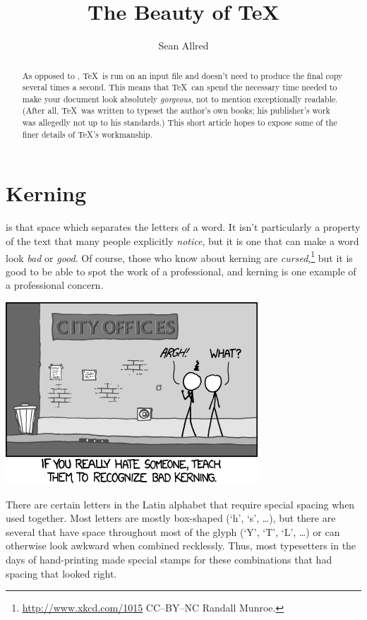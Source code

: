 \documentclass{article}
\title{The Beauty of \TeX}
\author{Sean Allred}
\begin{document}
\maketitle

\begin{abstract}
As opposed to \MicrosoftWord,
  \TeX\ is run on an input file and
  doesn't need to produce the final copy
  several times a second.
This means that \TeX\ can spend
  the necessary time needed
  to make your document
  look absolutely \emph{gorgeous},
  not to mention exceptionally readable.
(After all, \TeX\ was written to typeset the author's own books;
 his publisher's work was allegedly not up to his standards.)
This short article hopes
  to expose some of the finer details
  of \TeX's workmanship.
\end{abstract}
\vfil
\tableofcontents
\newpage

\section{Kerning}
\label{sec:kerning}

 is that space which separates the letters of a word.
It isn't particularly a property of the text that many people explicitly \emph{notice},
  but it is one that can make a word look \emph{bad} or \emph{good}.
Of course, those who know about kerning are \emph{cursed},\footnote{%
  \url{http://www.xkcd.com/1015} CC--BY--NC Randall Munroe.}
  but it is good to be able to spot the work of a professional,
  and kerning is one example of a professional concern.

\begin{center}
  \includegraphics[width=.5\linewidth]{xkcd-kerning}
\end{center}

\noindent
There are certain letters in the Latin alphabet that
  require special spacing when used together.
Most letters are mostly box-shaped (`h', `s', \dots),
  but there are several that have space
  throughout most of the glyph (`Y', `T', `L', \dots)
  or can otherwise look awkward when combined recklessly.
Thus, most typesetters in the days of hand-printing
  made special stamps for these combinations
  that had spacing that looked right.
\end{document}
